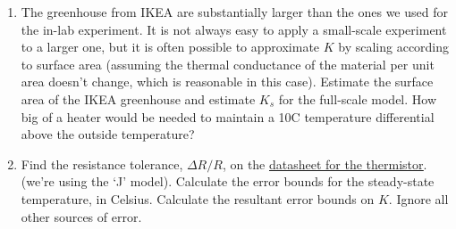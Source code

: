 \documentclass[11pt]{article} %
\begin{document}
\begin{enumerate}
\item The greenhouse from IKEA are substantially larger than the ones we used for the in-lab experiment. It is not always easy to apply a small-scale experiment to a larger one, but it is often possible to approximate $K$ by scaling according to surface area (assuming the thermal conductance of the material per unit area doesn't change, which is reasonable in this case). Estimate the surface area of the IKEA greenhouse and estimate $K_s$ for the full-scale model. How big of a heater would be needed to maintain a 10C temperature differential above the outside temperature?
\vspace{2in}
\item Find the resistance tolerance, $\Delta R/R$, on the \href{http://en.tdk.eu/inf/50/db/ntc_13/NTC_Leaded_disks_K164.pdf}{\underline{datasheet for the thermistor}}. (we’re using the ‘J’ model). Calculate the error bounds for the steady-state temperature, in Celsius. Calculate the resultant error bounds on $K$. Ignore all other sources of error.
\end{enumerate}

\clearpage
\end{document}
